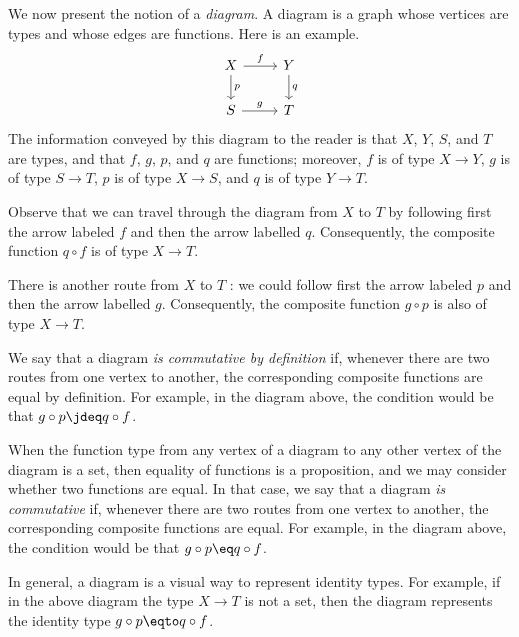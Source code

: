 \begin{remark}\label{rem:diagram}
We now present the notion of a \emph{diagram}.  A diagram is a graph
whose vertices are types and whose edges are functions.  Here is an example.
\[
\begin{tikzcd}
  X \ar[r,"f"] \ar[d,"p"] & Y \ar[d,"q"] \\
  S \ar[r,"g"]            & T
\end{tikzcd}
\]
The information conveyed by this diagram to the reader is that $X$, $Y$, $S$, and $T$ are types, and that $f$, $g$, $p$, and $q$
are functions; moreover, $f$ is of type $X \to Y$, $g$ is of type $S \to T$, $p$ is of type $X \to S$, and $q$ is of type $Y \to T$.

Observe that we can travel through the diagram from $X$ to $T$ by following first the arrow labeled $f$ and then the arrow labelled $q$.
Consequently, the composite function $q \circ f$ is of type $X \to T$.

There is another route from $X$ to $T$ : we could follow first the arrow labeled $p$ and then the arrow labelled $g$.
Consequently, the composite function $g \circ p$ is also of type $X \to T$.

We say that a diagram \emph{is commutative by definition} if, whenever there are two routes from one
vertex to another, the corresponding composite functions are equal by definition.  For example, in the diagram above, the condition would be that
$g \circ p \jdeq q \circ f$.

When the function type from any vertex of a diagram to any other vertex of the diagram is a set, then equality of functions is a proposition,
and we may consider whether two functions are equal.  In that case, we say that a diagram \emph{is commutative} if,
whenever there are two routes from one vertex to another, the corresponding composite functions are equal.  For example, in the diagram above,
the condition would be that $g \circ p \eq q \circ f$.

In general, a diagram is a visual way to represent identity types.
For example, if in the above diagram the type $X\to T$ is not
a set, then the diagram represents the identity type
$g \circ p \eqto q \circ f$.



\end{remark}
